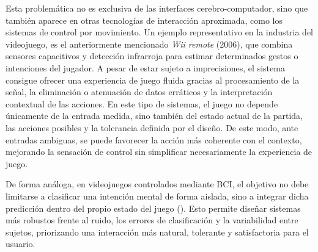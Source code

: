 Esta problemática no es exclusiva de las interfaces cerebro-computador, sino que también aparece en otras tecnologías de interacción aproximada, como los sistemas de control por movimiento. Un ejemplo representativo en la industria del videojuego, es el anteriormente mencionado \textit{Wii remote} (2006), que combina sensores capacitivos y detección infrarroja para estimar determinados gestos o intenciones del jugador. A pesar de estar sujeto a imprecisiones, el sistema consigue ofrecer una experiencia de juego fluida gracias al procesamiento de la señal, la eliminación o atenuación de datos erráticos y la interpretación contextual de las acciones. En este tipo de sistemas, el juego no depende únicamente de la entrada medida, sino también del estado actual de la partida, las acciones posibles y la tolerancia definida por el diseño. De este modo, ante entradas ambiguas, se puede favorecer la acción más coherente con el contexto, mejorando la sensación de control sin simplificar necesariamente la experiencia de juego.

De forma análoga, en videojuegos controlados mediante BCI, el objetivo no debe limitarse a clasificar una intención mental de forma aislada, sino a integrar dicha predicción dentro del propio estado del juego (\cite{zander2011towards}). Esto permite diseñar sistemas más robustos frente al ruido, los errores de clasificación y la variabilidad entre sujetos, priorizando una interacción más natural, tolerante y satisfactoria para el usuario.